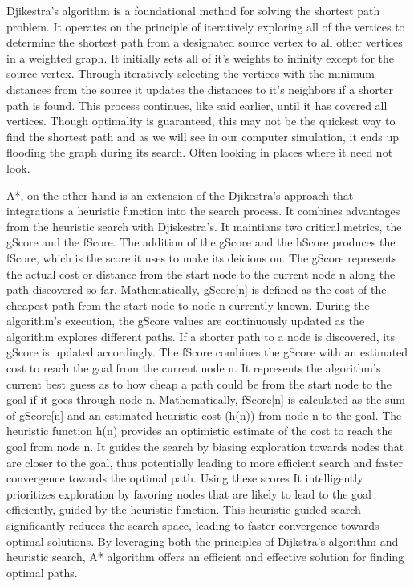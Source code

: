 \documentclass[twocolumn]{article}
\begin{document}
Djikestra's algorithm is a foundational method for solving the shortest path problem. It operates on the principle of iteratively exploring all of the vertices to determine the shortest path from a designated source vertex to all other vertices in a weighted graph. It initially sets all of it's weights to infinity except for the source vertex. Through iteratively selecting the vertices with the minimum distances from the source it updates the distances to it's neighbors if a shorter path is found. This process continues, like said earlier, until it has covered all vertices. Though optimality is guaranteed, this may not be the quickest way to find the shortest path and as we will see in our computer simulation, it ends up flooding the graph during its search. Often looking in places where it need not look. 

A*, on the other hand is an extension of the Djikestra's approach that integrations a heuristic function into the search process. It combines advantages from the heuristic search with Djiskestra's. It maintians two critical metrics, the gScore and the fScore. The addition of the gScore and the hScore produces the fScore, which is the score it uses to make its deicions on. The gScore represents the actual cost or distance from the start node to the current node n along the path discovered so far. Mathematically, gScore[n] is defined as the cost of the cheapest path from the start node to node n currently known. During the algorithm's execution, the gScore values are continuously updated as the algorithm explores different paths. If a shorter path to a node is discovered, its gScore is updated accordingly. The fScore combines the gScore with an estimated cost to reach the goal from the current node n. It represents the algorithm's current best guess as to how cheap a path could be from the start node to the goal if it goes through node n. Mathematically, fScore[n] is calculated as the sum of gScore[n] and an estimated heuristic cost (h(n)) from node n to the goal. The heuristic function h(n) provides an optimistic estimate of the cost to reach the goal from node n. It guides the search by biasing exploration towards nodes that are closer to the goal, thus potentially leading to more efficient search and faster convergence towards the optimal path. Using these scores  It intelligently prioritizes exploration by favoring nodes that are likely to lead to the goal efficiently, guided by the heuristic function. This heuristic-guided search significantly reduces the search space, leading to faster convergence towards optimal solutions. By leveraging both the principles of Dijkstra's algorithm and heuristic search, A* algorithm offers an efficient and effective solution for finding optimal paths. 
\end{document}
